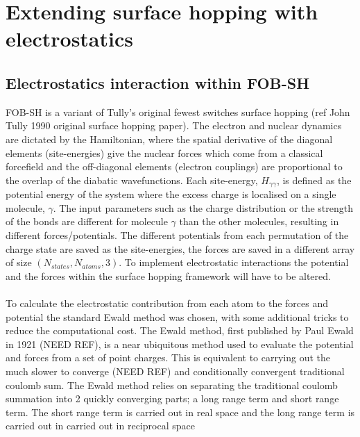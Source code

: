 \chapter{Extending surface hopping with electrostatics}
\label{chap:surface_hopping_ES}

\section{Electrostatics interaction within FOB-SH}
FOB-SH is a variant of Tully's original fewest switches surface hopping \cite{} (ref John Tully 1990 original surface hopping paper). The electron and nuclear dynamics are dictated by the Hamiltonian, where the spatial derivative of the diagonal elements (site-energies) give the nuclear forces which come from a classical forcefield and the off-diagonal elements (electron couplings) are proportional to the overlap of the diabatic wavefunctions. Each site-energy, $H_{\gamma \gamma}$, is defined as the potential energy of the system where the excess charge is localised on a single molecule, $\gamma$. The input parameters such as the charge distribution or the strength of the bonds are different for molecule $\gamma$ than the other molecules, resulting in different forces/potentials. The different potentials from each permutation of the charge state are saved as the site-energies, the forces are saved in a different array of size $(N_{states}, N_{atoms}, 3)$. To implement electrostatic interactions the potential and the forces within the surface hopping framework will have to be altered.
\\\\
To calculate the electrostatic contribution from each atom to the forces and potential the standard Ewald method was chosen, with some additional tricks to reduce the computational cost. The Ewald method, first published by Paul Ewald in 1921 (NEED REF), is a near ubiquitous method used to evaluate the potential and forces from a set of point charges. This is equivalent to carrying out the much slower to converge (NEED REF) and conditionally convergent traditional coulomb sum. The Ewald method relies on separating the traditional coulomb summation into 2 quickly converging parts; a long range term and short range term. The short range term is carried out in real space and the long range term is carried out in carried out in reciprocal space
